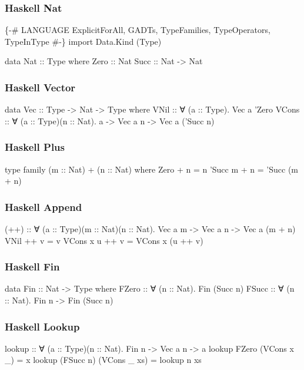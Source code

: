 \documentclass{beamer}
\begin{document}
\begin{frame}[fragile]\frametitle{Haskell Nat}
\begin{semiverbatim}
\{-# LANGUAGE ExplicitForAll, GADTs, TypeFamilies,
             TypeOperators, TypeInType #-\}
import Data.Kind (Type)

data Nat :: Type where
  Zero :: Nat
  Succ :: Nat -> Nat
\end{semiverbatim}
\end{frame}

\begin{frame}[fragile]\frametitle{Haskell Vector}
\begin{semiverbatim}
data Vec :: Type -> Nat -> Type where
  VNil  :: ∀ (a :: Type). Vec a 'Zero
  VCons :: ∀ (a :: Type)(n :: Nat).
    a -> Vec a n -> Vec a ('Succ n)
\end{semiverbatim}
\end{frame}

\begin{frame}[fragile]\frametitle{Haskell Plus}
\begin{semiverbatim}
type family (m :: Nat) + (n :: Nat) where
  Zero    + n = n
  'Succ m + n = 'Succ (m + n)
\end{semiverbatim}
\end{frame}

\begin{frame}[fragile]\frametitle{Haskell Append}
\begin{semiverbatim}
(++) :: ∀ (a :: Type)(m :: Nat)(n :: Nat).
        Vec a m -> Vec a n -> Vec a (m + n)
VNil      ++ v = v
VCons x u ++ v = VCons x (u ++ v)
\end{semiverbatim}
\end{frame}

\begin{frame}[fragile]\frametitle{Haskell Fin}
\begin{semiverbatim}
data Fin :: Nat -> Type where
  FZero :: ∀ (n :: Nat).          Fin (Succ n)
  FSucc :: ∀ (n :: Nat). Fin n -> Fin (Succ n)
\end{semiverbatim}
\end{frame}

\begin{frame}[fragile]\frametitle{Haskell Lookup}
\begin{semiverbatim}
lookup :: ∀ (a :: Type)(n :: Nat). Fin n -> Vec a n -> a
lookup FZero     (VCons x _)  = x
lookup (FSucc n) (VCons _ xs) = lookup n xs
\end{semiverbatim}
\end{frame}
\end{document}
